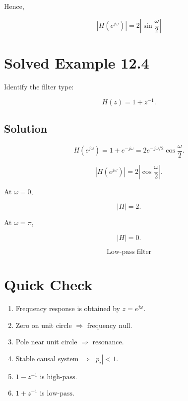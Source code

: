 Hence,

\[
\boxed{
|H(e^{j\omega})|=
2\left|\sin\frac{\omega}{2}\right|
}
\]


\section{Solved Example 12.4}

Identify the filter type:

\[
H(z)=1+z^{-1}.
\]


\subsection{Solution}

\[
H(e^{j\omega})=
1+e^{-j\omega}
=
2e^{-j\omega/2}\cos\frac{\omega}{2}.
\]

\[
|H(e^{j\omega})|=
2\left|\cos\frac{\omega}{2}\right|.
\]

At \(\omega=0\),

\[
|H|=2.
\]

At \(\omega=\pi\),

\[
|H|=0.
\]

\[
\boxed{
\text{Low-pass filter}
}
\]


\section{Quick Check}

\begin{enumerate}
\item Frequency response is obtained by \(\boxed{z=e^{j\omega}}\).
\item Zero on unit circle \(\Rightarrow\) \(\boxed{\text{frequency null}}\).
\item Pole near unit circle \(\Rightarrow\) \(\boxed{\text{resonance}}\).
\item Stable causal system \(\Rightarrow\) \(\boxed{|p_i|<1}\).
\item \(1-z^{-1}\) is \(\boxed{\text{high-pass}}\).
\item \(1+z^{-1}\) is \(\boxed{\text{low-pass}}\).
\end{enumerate}

